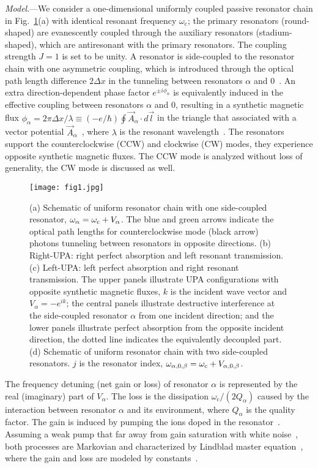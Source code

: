 \documentclass[prl,showpacs,superscriptaddress,twocolumn]{revtex4-1}
\begin{document}
\emph{Model}.---We consider a one-dimensional uniformly coupled passive
resonator chain in Fig.~\ref{fig1}(a) with identical resonant frequency $%
\omega _{\mathrm{c}}$; the primary resonators (round-shaped) are
evanescently coupled through the auxiliary resonators (stadium-shaped),
which are antiresonant with the primary resonators. The coupling strength $%
J=1$ is set to be unity. A resonator is side-coupled to the resonator chain
with one asymmetric coupling, which is introduced through the optical path
length difference $2\Delta x$ in the tunneling between resonators $\alpha $
and $0$~\cite{Hafezi}. An extra direction-dependent phase factor $e^{\pm
i\phi _{\alpha }}$ is equivalently induced in the effective coupling between
resonators $\alpha$ and $0$, resulting in a synthetic magnetic flux $\phi
_{\alpha }=2\pi \Delta x/\lambda \equiv (-e/\hbar )\oint \vec{A}_{\alpha
}\cdot d\vec{l}$ in the triangle that associated with a vector potential $%
\vec{A}_{\alpha }$~\cite{LLu,ELi,NP13}, where $\lambda $ is the resonant
wavelength~\cite{HafeziIJMPB}. The resonators support the counterclockwise
(CCW) and clockwise (CW) modes, they experience opposite synthetic magnetic
fluxes. The CCW mode is analyzed without loss of generality, the CW mode is
discussed as well.

\begin{figure}[tb]
\texttt{[image: fig1.jpg]}
\caption{(a) Schematic of uniform resonator chain with one side-coupled resonator, $\omega_{\alpha}=\omega_{\rm{c}}+V_{\alpha}$.
The blue and green arrows indicate the optical path lengths for counterclockwise mode (black arrow) photons tunneling between resonators in opposite directions. (b) Right-UPA: right perfect absorption and left resonant transmission. (c) Left-UPA: left perfect absorption and right resonant transmission. The upper
panels illustrate UPA configurations with opposite synthetic magnetic fluxes, $k$ is the incident wave vector and $V_{\alpha}=-e^{ik}$; the central panels illustrate destructive interference at the side-coupled resonator $\alpha$ from one incident direction; and the lower panels illustrate perfect absorption from the opposite incident direction, the dotted line indicates the equivalently decoupled part. (d) Schematic of uniform resonator chain with two side-coupled resonators. $j$ is the resonator index, $\omega_{\alpha, 0, \beta}=\omega_{\rm{c}}+V_{\alpha, 0, \beta}$.}
\label{fig1}
\end{figure}

The frequency detuning (net gain or loss) of resonator $\alpha $ is
represented by the real (imaginary) part of $V_{\alpha }$. The loss is the
dissipation $\omega _{\mathrm{c}}/(2Q_{\alpha})$ caused by the interaction
between resonator $\alpha $ and its environment, where $Q_{\alpha}$ is the
quality factor. The gain is induced by pumping the ions doped in the
resonator~\cite{Chang,BP}. Assuming a weak pump that far away from gain
saturation with white noise~\cite{Haken,SYZhu}, both processes are Markovian
and characterized by Lindblad master equation~\cite{Breuer,Scully}, where
the gain and loss are modeled by constants~\cite%
{BP,USS,FengScience,JLNC,Chang}.
\end{document}
